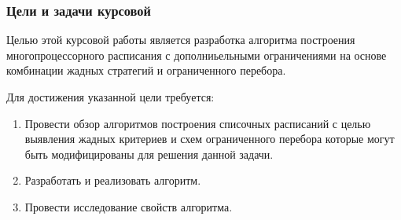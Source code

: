 \begin{frame}
    \frametitle{Цели и задачи курсовой}
    Целью этой курсовой работы является разработка алгоритма построения многопроцессорного расписания с дополниьельными ограничениями на основе комбинации жадных стратегий и ограниченного перебора. 

    Для достижения указанной цели требуется:
    \begin{enumerate}
        \item Провести обзор алгоритмов построения списочных расписаний с целью выявления жадных критериев и схем ограниченного перебора которые могут быть модифицированы для решения данной задачи.
        \item Разработать и реализовать алгоритм.
        \item Провести исследование свойств алгоритма.
    \end{enumerate}
\end{frame}